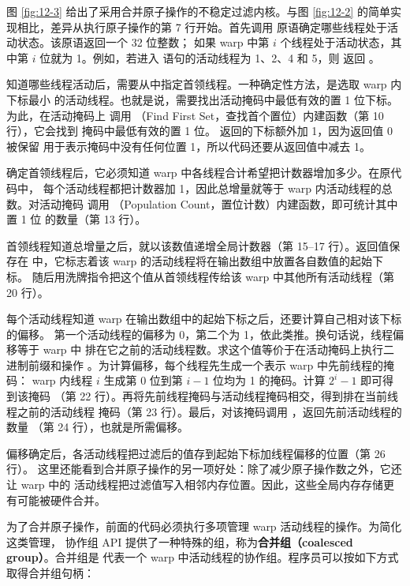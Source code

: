 图 \ref{fig:12-3} 给出了采用合并原子操作的不稳定过滤内核。与图 \ref{fig:12-2}
的简单实现相比，差异从执行原子操作的第 7 行开始。首先调用
 原语确定哪些线程处于活动状态。该原语返回一个 32 位整数；
如果 warp 中第 $i$ 个线程处于活动状态，其中第 $i$ 位就为 1。例如，若进入
 语句的活动线程为 1、2、4 和 5，则  返回
。

知道哪些线程活动后，需要从中指定首领线程。一种确定性方法，是选取 warp 内下标最小
的活动线程。也就是说，需要找出活动掩码中最低有效的置 1 位下标。为此，在活动掩码上
调用 （Find First Set，查找首个置位）内建函数（第 10 行），它会找到
掩码中最低有效的置 1 位。 返回的下标额外加 1，因为返回值 0 被保留
用于表示掩码中没有任何位置 1，所以代码还要从返回值中减去 1。

确定首领线程后，它必须知道 warp 中各线程合计希望把计数器增加多少。在原代码中，
每个活动线程都把计数器加 1，因此总增量就等于 warp 内活动线程的总数。对活动掩码
调用 （Population Count，置位计数）内建函数，即可统计其中置 1 位
的数量（第 13 行）。

首领线程知道总增量之后，就以该数值递增全局计数器（第 15--17 行）。返回值保存在
 中，它标志着该 warp 的活动线程将在输出数组中放置各自数值的起始下标。
随后用洗牌指令把这个值从首领线程传给该 warp 中其他所有活动线程（第 20 行）。

每个活动线程知道 warp 在输出数组中的起始下标之后，还要计算自己相对该下标的偏移。
第一个活动线程的偏移为 0，第二个为 1，依此类推。换句话说，线程偏移等于 warp 中
排在它之前的活动线程数。求这个值等价于在活动掩码上执行二进制前缀和操作
\cite{harris2012prefix}。为计算偏移，每个线程先生成一个表示 warp 中先前线程的掩码：
warp 内线程 $i$ 生成第 0 位到第 $i-1$ 位均为 1 的掩码。计算 $2^i-1$ 即可得到该掩码
（第 22 行）。再将先前线程掩码与活动线程掩码相交，得到排在当前线程之前的活动线程
掩码（第 23 行）。最后，对该掩码调用 ，返回先前活动线程的数量
（第 24 行），也就是所需偏移。

偏移确定后，各活动线程把过滤后的值存到起始下标加线程偏移的位置（第 26 行）。
这里还能看到合并原子操作的另一项好处：除了减少原子操作数之外，它还让 warp 中的
活动线程把过滤值写入相邻内存位置。因此，这些全局内存存储更有可能被硬件合并。

为了合并原子操作，前面的代码必须执行多项管理 warp 活动线程的操作。为简化这类管理，
协作组 API 提供了一种特殊的组，称为\textbf{合并组（coalesced group）}。合并组是
代表一个 warp 中活动线程的协作组。程序员可以按如下方式取得合并组句柄：


